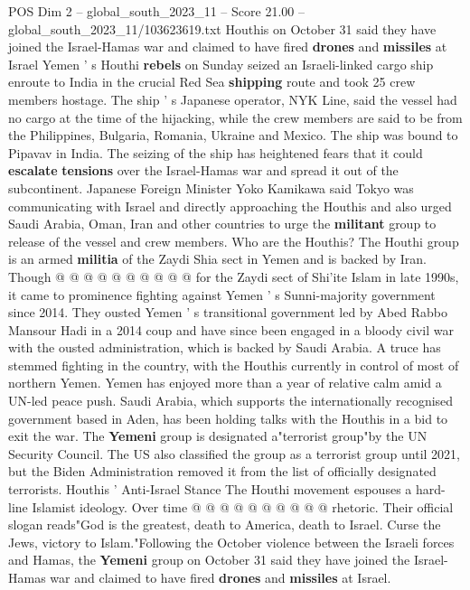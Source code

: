 \begin{textsample}{POS Dim 2 – global\_south\_2023\_11 – Score 21.00 – global\_south\_2023\_11/103623619.txt}  \label{ex:f2_pos_214}
Houthis on October 31 said they have joined the Israel-Hamas war and claimed to have fired \textbf{drones} and \textbf{missiles} at Israel Yemen ' s Houthi \textbf{rebels} on Sunday seized an Israeli-linked cargo ship enroute to India in the crucial Red Sea \textbf{shipping} route and took 25 crew members hostage.
The ship ' s Japanese operator, NYK Line, said the vessel had no cargo at the time of the hijacking, while the crew members are said to be from the Philippines, Bulgaria, Romania, Ukraine and Mexico.
The ship was bound to Pipavav in India.
The seizing of the ship has heightened fears that it could \textbf{escalate} \textbf{tensions} over the Israel-Hamas war and spread it out of the subcontinent.
Japanese Foreign Minister Yoko Kamikawa said Tokyo was communicating with Israel and directly approaching the Houthis and also urged Saudi Arabia, Oman, Iran and other countries to urge the \textbf{militant} group to release of the vessel and crew members.
Who are the Houthis?
The Houthi group is an armed \textbf{militia} of the Zaydi Shia sect in Yemen and is backed by Iran.
Though @ @ @ @ @ @ @ @ @ @ for the Zaydi sect of Shi'ite Islam in late 1990s, it came to prominence fighting against Yemen ' s Sunni-majority government since 2014.
They ousted Yemen ' s transitional government led by Abed Rabbo Mansour Hadi in a 2014 coup and have since been engaged in a bloody civil war with the ousted administration, which is backed by Saudi Arabia.
A truce has stemmed fighting in the country, with the Houthis currently in control of most of northern Yemen.
Yemen has enjoyed more than a year of relative calm amid a UN-led peace push.
Saudi Arabia, which supports the internationally recognised government based in Aden, has been holding talks with the Houthis in a bid to exit the war.
The \textbf{Yemeni} group is designated a"terrorist group"by the UN Security Council.
The US also classified the group as a terrorist group until 2021, but the Biden Administration removed it from the list of officially designated terrorists.
Houthis ' Anti-Israel Stance The Houthi movement espouses a hard-line Islamist ideology.
Over time @ @ @ @ @ @ @ @ @ @ rhetoric.
Their official slogan reads"God is the greatest, death to America, death to Israel.
Curse the Jews, victory to Islam."Following the October violence between the Israeli forces and Hamas, the \textbf{Yemeni} group on October 31 said they have joined the Israel-Hamas war and claimed to have fired \textbf{drones} and \textbf{missiles} at Israel.

\end{textsample}
